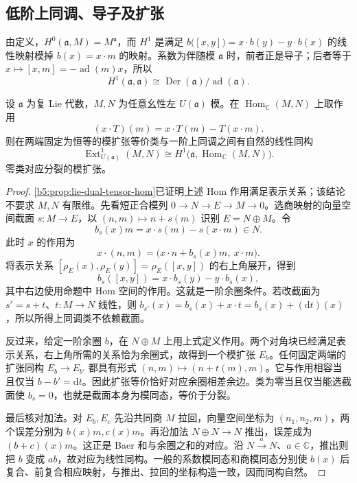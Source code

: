 \subsection{低阶上同调、导子及扩张}
\label{b5:subsec:2003:02}

由定义，\(H^0(\mathfrak a,M)=M^{\mathfrak a}\)，而 \(H^1\) 是满足 \(b\bigl([x,y]\bigr)=x\cdot b(y)-y\cdot b(x)\) 的线性映射模掉 \(b(x)=x\cdot m\) 的映射。系数为伴随模 \(\mathfrak a\) 时，前者正是导子；后者等于 \(x\mapsto[x,m]=-\operatorname{ad}(m)x\)，所以
\[
	H^1(\mathfrak a,\mathfrak a) \cong\operatorname{Der}(\mathfrak a)/\operatorname{ad}(\mathfrak a).
\]

\begin{proposition}\label{b5:prop:lie-module-ext-one}
	设 \(\mathfrak a\) 为复 Lie 代数，\(M,N\) 为任意幺性左 \(U(\mathfrak a)\) 模。在 \(\operatorname{Hom}_{\mathbb C}(M,N)\) 上取作用
	\[
		(x\cdot T)(m)=x\cdot T(m)-T(x\cdot m).
	\]
	则在两端固定为恒等的模扩张等价类与一阶上同调之间有自然的线性同构
	\[
		\operatorname{Ext}^1_{U(\mathfrak a)}(M,N) \cong H^1\bigl(\mathfrak a,\operatorname{Hom}_{\mathbb C}(M,N)\bigr).
	\]
	零类对应分裂的模扩张。
\end{proposition}
\begin{proof}
	\cref{b5:prop:lie-dual-tensor-hom}已证明上述 Hom 作用满足表示关系；该结论不要求 \(M,N\) 有限维。先看短正合模列 \(0\to N\to E\to M\to0\)。选商映射的向量空间截面 \(s:M\to E\)，以 \((n,m)\mapsto n+s(m)\) 识别 \(E=N\oplus M\)。令
	\[
		b_s(x)m=x\cdot s(m)-s(x\cdot m)\in N.
	\]
	此时 \(x\) 的作用为
	\[
		x\cdot(n,m)=\bigl(x\cdot n+b_s(x)m,\ x\cdot m\bigr).
	\]
	将表示关系 \([\rho_E(x),\rho_E(y)]=\rho_E([x,y])\) 的右上角展开，得到
	\[
		b_s([x,y])=x\cdot b_s(y)-y\cdot b_s(x),
	\]
	其中右边使用命题中 Hom 空间的作用。这就是一阶余圈条件。若改截面为 \(s'=s+t\)、\(t:M\to N\) 线性，则 \(b_{s'}(x)=b_s(x)+x\cdot t=b_s(x)+(\mathrm{d}t)(x)\)，所以所得上同调类不依赖截面。

	反过来，给定一阶余圈 \(b\)，在 \(N\oplus M\) 上用上式定义作用。两个对角块已经满足表示关系，右上角所需的关系恰为余圈式，故得到一个模扩张 \(E_b\)。任何固定两端的扩张同构 \(E_b\to E_{b'}\) 都具有形式 \((n,m)\mapsto(n+t(m),m)\)。它与作用相容当且仅当 \(b-b'=\mathrm{d}t\)。因此扩张等价恰好对应余圈相差余边。类为零当且仅当能选截面使 \(b_s=0\)，也就是截面本身为模同态，等价于分裂。

	最后核对加法。对 \(E_b,E_c\) 先沿共同商 \(M\) 拉回，向量空间坐标为 \((n_1,n_2,m)\)，两个误差分别为 \(b(x)m,c(x)m\)。再沿加法 \(N\oplus N\to N\) 推出，误差成为 \((b+c)(x)m\)。这正是 Baer 和与余圈之和的对应。沿 \(N\xrightarrow{a}N\)、\(a\in\mathbb C\)，推出则把 \(b\) 变成 \(ab\)，故对应为线性同构。一般的系数模同态和商模同态分别使 \(b(x)\) 后复合、前复合相应映射，与推出、拉回的坐标构造一致，因而同构自然。
\end{proof}

